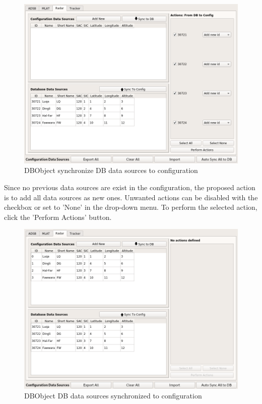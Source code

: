 \begin{figure}[H]
  \center
    \includegraphics[width=16cm,frame]{../screenshots//manage_data_sources_edit_ds_sync2cfg.png}
  \caption{DBObject synchronize DB data sources to configuration }
\end{figure}

Since no previous data sources are exist in the configuration, the proposed action is to add all data sources as new ones. Unwanted actions can be disabled with the checkbox or set to 'None' in the drop-down menu. To perform the selected action, click the 'Perform Actions' button.

\begin{figure}[H]
  \center
    \includegraphics[width=16cm,frame]{../screenshots/manage_data_sources_edit_ds_db2cfgsynced.png}
  \caption{DBObject DB data sources synchronized to configuration }
\end{figure}

